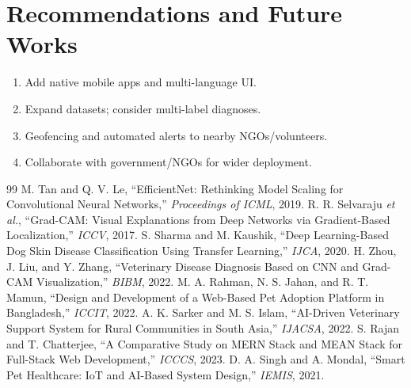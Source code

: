 \documentclass[12pt,a4paper]{report}
\numberwithin{figure}{chapter}
\numberwithin{table}{chapter}
\begin{document}
\section{Recommendations and Future Works}
\begin{enumerate}
  \item Add native mobile apps and multi-language UI.
  \item Expand datasets; consider multi-label diagnoses.
  \item Geofencing and automated alerts to nearby NGOs/volunteers.
  \item Collaborate with government/NGOs for wider deployment.
\end{enumerate}

\begin{thebibliography}{99}
 M. Tan and Q. V. Le, ``EfficientNet: Rethinking Model Scaling for Convolutional Neural Networks,'' \textit{Proceedings of ICML}, 2019.
 R. R. Selvaraju \textit{et al.}, ``Grad-CAM: Visual Explanations from Deep Networks via Gradient-Based Localization,'' \textit{ICCV}, 2017.
 S. Sharma and M. Kaushik, ``Deep Learning-Based Dog Skin Disease Classification Using Transfer Learning,'' \textit{IJCA}, 2020.
 H. Zhou, J. Liu, and Y. Zhang, ``Veterinary Disease Diagnosis Based on CNN and Grad-CAM Visualization,'' \textit{BIBM}, 2022.
 M. A. Rahman, N. S. Jahan, and R. T. Mamun, ``Design and Development of a Web-Based Pet Adoption Platform in Bangladesh,'' \textit{ICCIT}, 2022.
 A. K. Sarker and M. S. Islam, ``AI-Driven Veterinary Support System for Rural Communities in South Asia,'' \textit{IJACSA}, 2022.
 S. Rajan and T. Chatterjee, ``A Comparative Study on MERN Stack and MEAN Stack for Full-Stack Web Development,'' \textit{ICCCS}, 2023.
 D. A. Singh and A. Mondal, ``Smart Pet Healthcare: IoT and AI-Based System Design,'' \textit{IEMIS}, 2021.
\end{thebibliography}
\end{document}
